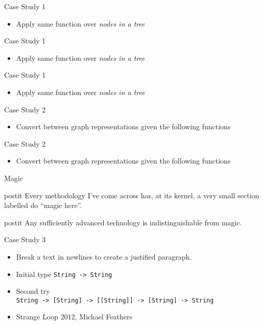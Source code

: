 \documentclass{beamer}
\renewcommand\quote[3]{
  \begin{beamercolorbox}[wd=\textwidth,rounded=true,shadow=true]{postit}
    #3
    \vskip5mm
    \hspace*\fill{\small{#1, \textit{#2}}}
  \end{beamercolorbox}
}
\begin{document}
\begin{frame}{Case Study 1}
  \begin{itemize}
    \item Apply same function over \textit{nodes in a tree}
  \end{itemize}
  
\end{frame}

\begin{frame}{Case Study 1}
  \begin{itemize}
    \item Apply same function over \textit{nodes in a tree}
  \end{itemize}
  \tiny
  
\end{frame}

\begin{frame}{Case Study 1}
  \begin{itemize}
    \item Apply same function over \textit{nodes in a tree}
  \end{itemize}
  \tiny
  
\end{frame}

\begin{frame}{Case Study 2}
  \begin{itemize}
    \item Convert between graph representations given the following functions
  \end{itemize}
  
\end{frame}

\begin{frame}{Case Study 2}
  \begin{itemize}
    \item Convert between graph representations given the following functions
  \end{itemize}
  
\end{frame}

\begin{frame}{Magic}
  \quote{-}{-}{Every methodology I've come across has, at its kernel, a very
  small section labelled do ``magic here''.}
  \pause
  \quote{Arthur C. Clarke}{-}{Any sufficiently advanced technology is
  indistinguishable from magic.}
\end{frame}

\begin{frame}{Case Study 3}
  \begin{itemize}[<+->]
    \item Break a text in newlines to create a justified paragraph.
    \item Initial type \texttt{String -> String}
    \item Second try\\ \small{\texttt{String -> [String] -> [[String]] ->
    [String] -> String}}
    \item Strange Loop 2012, Michael Feathers
  \end{itemize}
\end{frame}
\end{document}
